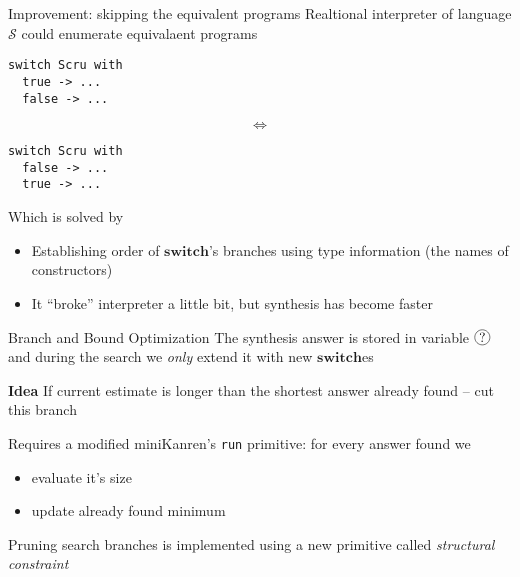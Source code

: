 \documentclass[aspectratio=169
  , xcolor={svgnames}
  , hyperref={ colorlinks,citecolor=Blue
             , linkcolor=DarkRed,urlcolor=DarkBlue}
  , russian
  ]{beamer}
\newcommand{\primi}[1]{\ensuremath{\mathbf{#1}}}
\newcommand{\ir}{\ensuremath{\mathcal{S}}}
\newcommand*\circled[1]{\tikz[baseline=(char.base)]{
    \node[shape=circle,draw,inner sep=1pt] (char) {#1};}}
\begin{document}
\begin{frame}[fragile]{Improvement: skipping the equivalent programs}
Realtional interpreter of language \ir{} could enumerate equivalaent programs 
\begin{center}
  \begin{minipage}[t]{0.2\linewidth}
  \begin{center}
  \begin{lstlisting}[language=ocamllambda,gobble=2]
  switch Scru with 
  true -> ...
  false -> ...
  \end{lstlisting}
  \end{center}
  \end{minipage}\hspace{.5cm}
  \begin{minipage}[t]{0.2\linewidth}
  \huge
  \begin{center}
  \[
  \Leftrightarrow
  \]
  \end{center}
  \end{minipage}\hspace{.5cm}
  \begin{minipage}[t]{0.2\linewidth}
  \begin{lstlisting}[language=ocamllambda,gobble=2]
  switch Scru with 
  false -> ...
  true -> ...
  \end{lstlisting}
  \end{minipage}
\end{center}
Which is solved by 
\begin{itemize}
\item Establishing order of \primi{switch}'s branches using type information (the names of constructors)
\item It ``broke'' interpreter a little bit, but synthesis has become faster 
\end{itemize}

\end{frame}


\begin{frame}{Branch and Bound Optimization}
The synthesis answer is stored in variable $\circled{?}$ and 
during the search we \emph{only} extend it with new $\primi{switch}$es \\

\begin{alertblock}{\textbf{Idea}}
If current estimate is longer than the shortest answer already found -- cut this branch
\end{alertblock}

Requires a modified miniKanren's \lstinline=run= primitive: for every answer found we 
\begin{itemize}
\item evaluate it's size
\item update already found minimum
\end{itemize}

Pruning search branches is implemented using a new primitive called  \emph{structural constraint}
\end{frame}
\end{document}
